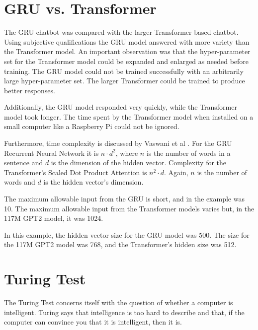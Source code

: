 

\section{GRU vs. Transformer}
The GRU chatbot was compared with the larger Transformer based chatbot. Using subjective qualifications the GRU model answered with more variety than the Transformer model. An important observation was that the hyper-parameter set for the Transformer model could be expanded and enlarged as needed before training. The GRU model could not be trained successfully with an arbitrarily large hyper-parameter set. The larger Transformer could be trained to produce better responses.

Additionally, the GRU model responded very quickly, while the Transformer model took longer. %
The time spent by the Transformer model when installed on a small computer like a Raspberry Pi could not be ignored. 


Furthermore, time complexity is discussed by Vaswani et al \cite{Vaswani2017AttentionIA}. 
For the GRU Recurrent Neural Network it is $ n \cdot d^2 $, where $ n $ is the number of words in a sentence and $ d $ is the dimension of the hidden vector. Complexity for the Transformer's Scaled Dot Product Attention is $ n^2 \cdot  d $. Again, $n$ is the number of words and $d$ is the hidden vector's dimension. 

The maximum allowable input from the GRU is short, and in the example was 10. The maximum allowable input from the Transformer models varies but, in the 117M GPT2 model, it was 1024. 

In this example, the hidden vector size for the GRU model was 500. The size for the 117M GPT2 model was 768, and the Transformer's hidden size was 512.

\section{Turing Test}

The Turing Test concerns itself with the question of whether a computer is intelligent. Turing says that intelligence is too hard to describe and that, if the computer can convince you that it is intelligent, then it is.

